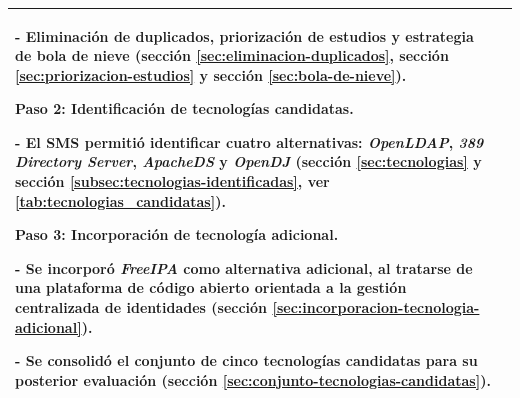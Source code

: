 \begin{table}[htbp]
\begin{tabular}{|>{\raggedright\arraybackslash}p{}|>{\raggedright\arraybackslash}p{}|}
		- \textbf{Eliminación de duplicados}, \textbf{priorización de estudios} y \textbf{estrategia de bola de nieve} (sección \textcolor[HTML]{1B6B93}{\ref{sec:eliminacion-duplicados}}, sección \textcolor[HTML]{1B6B93}{\ref{sec:priorizacion-estudios}} y sección \textcolor[HTML]{1B6B93}{\ref{sec:bola-de-nieve}}).\par\vspace{0.6em}
		\textbf{Paso 2: Identificación de tecnologías candidatas.}\par\vspace{0.4em}
		- El \ac{SMS} permitió identificar cuatro alternativas: \textit{OpenLDAP}, \textit{389 Directory Server}, \textit{ApacheDS} y \textit{OpenDJ} (sección \textcolor[HTML]{1B6B93}{\ref{sec:tecnologias}} y sección \textcolor[HTML]{1B6B93}{\ref{subsec:tecnologias-identificadas}}, ver \autoref{tab:tecnologias_candidatas}).\par\vspace{0.6em}
		\textbf{Paso 3: Incorporación de tecnología adicional.}\par\vspace{0.4em}
		- Se incorporó \textit{FreeIPA} como alternativa adicional, al tratarse de una plataforma de código abierto orientada a la gestión centralizada de identidades (sección \textcolor[HTML]{1B6B93}{\ref{sec:incorporacion-tecnologia-adicional}}).\par
		- Se consolidó el conjunto de cinco tecnologías candidatas para su posterior evaluación (sección \textcolor[HTML]{1B6B93}{\ref{sec:conjunto-tecnologias-candidatas}}).                                                                                                                                                          \\
		\hline
	\end{tabular}
\end{table}

